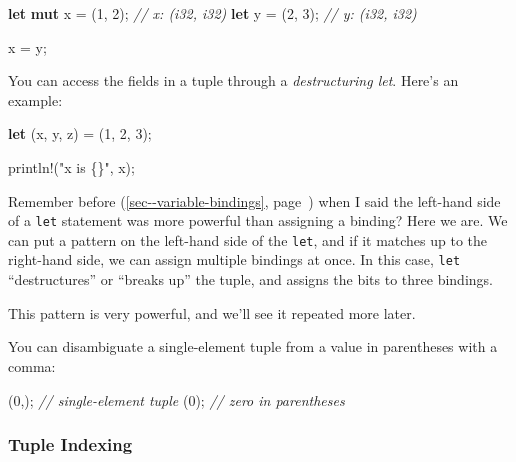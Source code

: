 \documentclass[a4paper,]{book}
\renewcommand*{\hyperref}[2][\ar]{%
  \def\ar{#2}%
  #2 (\autoref{#1}, page~\pageref{#1})}
\newenvironment{Shaded}{\begin{snugshade}}{\end{snugshade}}
\newcommand{\KeywordTok}[1]{\textcolor[rgb]{0.13,0.29,0.53}{\textbf{{#1}}}}
\newcommand{\DecValTok}[1]{\textcolor[rgb]{0.00,0.00,0.81}{{#1}}}
\newcommand{\StringTok}[1]{\textcolor[rgb]{0.31,0.60,0.02}{{#1}}}
\newcommand{\CommentTok}[1]{\textcolor[rgb]{0.56,0.35,0.01}{\textit{{#1}}}}
\newcommand{\OtherTok}[1]{\textcolor[rgb]{0.56,0.35,0.01}{{#1}}}
\newcommand{\NormalTok}[1]{{#1}}
\begin{document}
\begin{Shaded}
\begin{Highlighting}[]
\KeywordTok{let} \KeywordTok{mut} \NormalTok{x = (}\DecValTok{1}\NormalTok{, }\DecValTok{2}\NormalTok{); }\CommentTok{// x: (i32, i32)}
\KeywordTok{let} \NormalTok{y = (}\DecValTok{2}\NormalTok{, }\DecValTok{3}\NormalTok{); }\CommentTok{// y: (i32, i32)}

\NormalTok{x = y;}
\end{Highlighting}
\end{Shaded}

You can access the fields in a tuple through a \emph{destructuring let}.
Here's an example:

\begin{Shaded}
\begin{Highlighting}[]
\KeywordTok{let} \NormalTok{(x, y, z) = (}\DecValTok{1}\NormalTok{, }\DecValTok{2}\NormalTok{, }\DecValTok{3}\NormalTok{);}

\OtherTok{println!}\NormalTok{(}\StringTok{"x is \{\}"}\NormalTok{, x);}
\end{Highlighting}
\end{Shaded}

Remember \hyperref[sec--variable-bindings]{before} when I said the
left-hand side of a \texttt{let} statement was more powerful than
assigning a binding? Here we are. We can put a pattern on the left-hand
side of the \texttt{let}, and if it matches up to the right-hand side,
we can assign multiple bindings at once. In this case, \texttt{let}
``destructures'' or ``breaks up'' the tuple, and assigns the bits to
three bindings.

This pattern is very powerful, and we'll see it repeated more later.

You can disambiguate a single-element tuple from a value in parentheses
with a comma:

\begin{Shaded}
\begin{Highlighting}[]
\NormalTok{(}\DecValTok{0}\NormalTok{,); }\CommentTok{// single-element tuple}
\NormalTok{(}\DecValTok{0}\NormalTok{); }\CommentTok{// zero in parentheses}
\end{Highlighting}
\end{Shaded}

\subsubsection{Tuple Indexing}\label{tuple-indexing}
\end{document}
